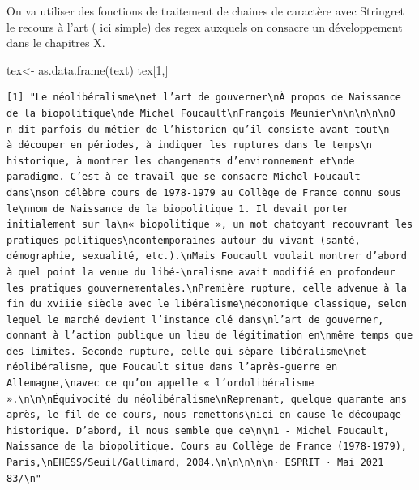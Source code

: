 \documentclass[
  letterpaper,
  DIV=11,
  numbers=noendperiod]{scrreprt}
\newenvironment{Shaded}{\begin{snugshade}}{\end{snugshade}}
\newcommand{\DecValTok}[1]{\textcolor[rgb]{0.68,0.00,0.00}{#1}}
\newcommand{\FunctionTok}[1]{\textcolor[rgb]{0.28,0.35,0.67}{#1}}
\newcommand{\NormalTok}[1]{\textcolor[rgb]{0.00,0.23,0.31}{#1}}
\newcommand{\OtherTok}[1]{\textcolor[rgb]{0.00,0.23,0.31}{#1}}
\begin{document}
On va utiliser des fonctions de traitement de chaines de caractère avec
Stringret le recours à l'art ( ici simple) des regex auxquels on
consacre un développement dans le chapitres X.

\begin{Shaded}
\begin{Highlighting}[]
\NormalTok{tex}\OtherTok{\textless{}{-}} \FunctionTok{as.data.frame}\NormalTok{(text)}
\NormalTok{tex[}\DecValTok{1}\NormalTok{,]}
\end{Highlighting}
\end{Shaded}

\begin{verbatim}
[1] "Le néolibéralisme\net l’art de gouverner\nÀ propos de Naissance de la biopolitique\nde Michel Foucault\nFrançois Meunier\n\n\n\n\nO          n dit parfois du métier de l’historien qu’il consiste avant tout\n           à découper en périodes, à indiquer les ruptures dans le temps\n           historique, à montrer les changements d’environnement et\nde paradigme. C’est à ce travail que se consacre Michel Foucault dans\nson célèbre cours de 1978‑1979 au Collège de France connu sous le\nnom de Naissance de la biopolitique 1. Il devait porter initialement sur la\n« biopolitique », un mot chatoyant recouvrant les pratiques politiques\ncontemporaines autour du vivant (santé, démographie, sexualité, etc.).\nMais Foucault voulait montrer d’abord à quel point la venue du libé‑\nralisme avait modifié en profondeur les pratiques gouvernementales.\nPremière rupture, celle advenue à la fin du xviiie siècle avec le libéralisme\néconomique classique, selon lequel le marché devient l’instance clé dans\nl’art de gouverner, donnant à l’action publique un lieu de légitimation en\nmême temps que des limites. Seconde rupture, celle qui sépare libéralisme\net néolibéralisme, que Foucault situe dans l’après‑guerre en Allemagne,\navec ce qu’on appelle « l’ordolibéralisme ».\n\n\nÉquivocité du néolibéralisme\nReprenant, quelque quarante ans après, le fil de ce cours, nous remettons\nici en cause le découpage historique. D’abord, il nous semble que ce\n\n1 - Michel Foucault, Naissance de la biopolitique. Cours au Collège de France (1978-1979), Paris,\nEHESS/Seuil/Gallimard, 2004.\n\n\n\n\n· ESPRIT · Mai 2021                                                                                 83/\n"
\end{verbatim}
\end{document}
